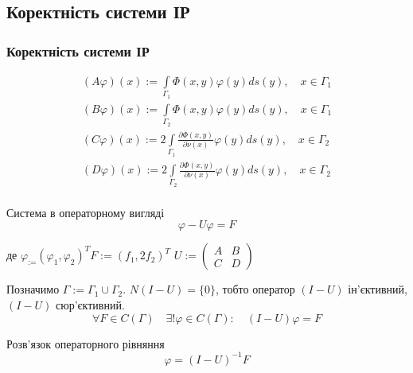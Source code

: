 \documentclass{beamer}
\numberwithin{equation}{section}
\newcommand{\intl}{\int\limits}
\begin{document}
	\subsection{Коректність системи ІР}
	\begin{frame}
		\frametitle{Коректність системи ІР}
		
	 	$$
		\begin{array}{l}
			
			\displaystyle
			(A \varphi)(x):= \intl_{\Gamma_{1}} \Phi(x, y) \varphi(y)  d s(y), \quad x \in \Gamma_{1}
			\\[0.7cm]
			
			\displaystyle
			(B \varphi)(x):=  \intl_{\Gamma_{2}} \Phi(x, y) \varphi(y)  d s(y), \quad x \in \Gamma_{1}
			\\[0.7cm]
			
			\displaystyle
			(C \varphi)(x):= 2 \intl_{\Gamma_{1}} \frac{\partial \Phi(x, y)}{\partial \nu(x)} \varphi(y)  d s(y), \quad x \in \Gamma_{2}
			\\[0.7cm]
			
			\displaystyle
			(D \varphi)(x):= 2 \intl_{\Gamma_{2}} \frac{\partial \Phi(x, y)}{\partial \nu(x)} \varphi(y)  d s(y), \quad x \in \Gamma_{2}
			\\[0.7cm]
		\end{array}
		$$
	
	\end{frame}
	
	\begin{frame}

		\begin{block}{Система в операторному вигляді}
			\begin{equation}
				\label{IE-operator}
				\varphi-U \varphi=F
			\end{equation}
		
		\end{block}
		
		де  $\displaystyle \varphi_:=\left(\varphi_{1}, \varphi_{2}\right)^{T} F:=\left(f_{1}, 2 f_{2}\right)^{T}$
		$
		\displaystyle
		U:=\left(\begin{array}{ll}
			A & B \\
			C & D
		\end{array}\right)
		$

		Позначимо $\Gamma:=\Gamma_{1} \cup \Gamma_{2}$.  $N(I-U)=\{0\}$, тобто оператор $(I-U)$ ін'єктивний, $(I-U)$ сюр'єктивний.
		$$
		\forall F \in C(\Gamma) \quad \exists ! \varphi \in C(\Gamma): \quad(I-U) \varphi=F
		$$

		\begin{block}{Розв'язок операторного рівняння}
			$$\varphi=(I-U)^{-1} F$$
		\end{block}
	
	\end{frame}
	
\end{document}
